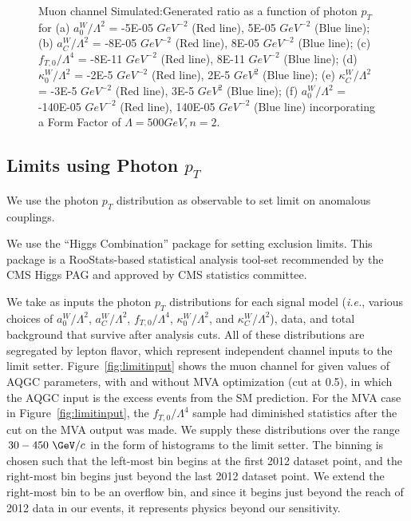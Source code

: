 \begin{figure}[]
\begin{center}
{  }
    \caption{Muon channel Simulated:Generated ratio as a function of photon $p_{T}$ for (a) $a_{0}^{W}/\Lambda^{2}$ = -5E-05 $GeV^{-2}$ (Red line), 5E-05 $GeV^{-2}$ (Blue line); (b) $a_{C}^{W}/\Lambda^{2}$ = -8E-05 $GeV^{-2}$ (Red line), 8E-05 $GeV^{-2}$ (Blue line); (c) $f_{T,0}/\Lambda^{4}$ = -8E-11 $GeV^{-2}$ (Red line), 8E-11 $GeV^{-2}$ (Blue line); (d) $\kappa_{0}^{W}/\Lambda^{2}$ = -2E-5 $GeV^{-2}$ (Red line), 2E-5 $GeV^{2}$ (Blue line); (e) $\kappa_{C}^{W}/\Lambda^{2}$ = -3E-5 $GeV^{-2}$ (Red line), 3E-5 $GeV^{2}$ (Blue line); (f) $a_{0}^{W}/\Lambda^{2}$ = -140E-05 $GeV^{-2}$ (Red line), 140E-05 $GeV^{-2}$ (Blue line) incorporating a Form Factor of $\Lambda = 500 GeV, n = 2$.}
  \label{fig:para_closure_ratio}
  \end{center}
\end{figure}

\newpage
\subsection{Limits using Photon $p_{T}$}
\label{sec:limits_pT}
We use the photon $p_T$ distribution as observable to set limit on anomalous
couplings.

We use the ``Higgs Combination'' package \cite{cite:combine} for
setting exclusion limits. This package is a
RooStats\cite{cite:roostats}-based statistical analysis tool-set
recommended by the CMS Higgs PAG and approved by CMS statistics committee.

We take as inputs the photon $p_T$ distributions for each signal model 
(\textit{i.e.}, various choices of $a_{0}^{W}/\Lambda^{2}$,  
$a_{C}^{W}/\Lambda^{2}$, $f_{T,0}/\Lambda^{4}$, $\kappa_{0}^{W}/\Lambda^{2}$, and 
$\kappa_{C}^{W}/\Lambda^{2}$), data, and total background that survive after
analysis cuts. All of these distributions are segregated by lepton flavor,
which represent independent channel inputs to the limit setter. 
Figure~\ref{fig:limitinput} shows the muon channel for given values of AQGC 
parameters, with and without MVA optimization (cut at 0.5), in which the AQGC input is the 
excess events from the SM prediction. For the MVA case in Figure~\ref{fig:limitinput},
the $f_{T,0}/\Lambda^{4}$ sample had diminished statistics after the cut on the MVA output
was made. We supply these distributions over the 
range $30-450~\GeV/c$ in the form of histograms to the limit setter. The binning 
is chosen such that the left-most bin begins at the first 2012 dataset point, and the 
right-most bin begins just beyond the last 2012 dataset point. We extend the
right-most bin to be an overflow bin, and since it begins just beyond the
reach of 2012 data in our events, it represents physics beyond our
sensitivity.

